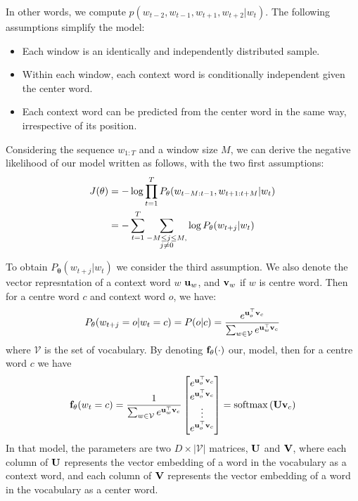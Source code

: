 In other words, we compute $p(w_{t-2}, w_{t-1}, w_{t+1}, w_{t+2} | w_t)$. The following assumptions simplify the model:
\begin{itemize}
    \item Each window is an identically and independently distributed sample.
    \item Within each window, each context word is conditionally independent given the center word.
    \item Each context word can be predicted from the center word in the same way, irrespective of its position.
\end{itemize}
Considering the sequence $w_{1:T}$ and a window size $M$, we can derive the negative likelihood of our model written as follows, with the two first assumptions:
\begin{align}
J(\mathbf{\theta}) &= -\log\prod_{t=1}^{T}P_{\mathbf{\theta}}(w_{t-M:t-1},w_{t+1:t+M}|w_t)\\
&=-\sum_{t=1}^{T}\sum_{\substack{-M\leq j \leq M,\\ j\neq 0}}\log P_{\mathbf{\theta}}(w_{t+j}|w_t)
\end{align}

To obtain $P_{\mathbf{\theta}}(w_{t+j}|w_t)$ we consider the third assumption. We also denote the vector represntation of a context word $w$ $\mathbf{u}_w$, and $\mathbf{v}_w$ if $w$ is centre word. Then for a centre word $c$ and context word $o$, we have:
\begin{equation}
	P_{\mathbf{\theta}}(w_{t+j}=o|w_t=c) = P(o|c) = \frac{e^{\mathbf{u}_o^\top\mathbf{v}_c}}{\sum_{w\in \mathcal{V}}e^{\mathbf{u}_{w}^\top\mathbf{v}_c}}
\end{equation}
where $\mathcal{V}$ is the set of vocabulary. By denoting $\mathbf{f_\theta}(\cdot)$ our, model, then for a centre word $c$ we have
\begin{equation}
	\mathbf{f_\theta}(w_t=c)=\frac{1}{\sum_{w\in \mathcal{V}}e^{\mathbf{u}_{w}^\top\mathbf{v}_c}}\begin{bmatrix}
		e^{\mathbf{u}_o^\top\mathbf{v}_c}\\
		e^{\mathbf{u}_o^\top\mathbf{v}_c}\\
		\vdots\\
		e^{\mathbf{u}_o^\top\mathbf{v}_c}\\
	\end{bmatrix}
	= \mathrm{softmax}\left(\mathbf{Uv}_c\right)
\end{equation}
In that model, the parameters are two $D \times |\mathcal{V}|$ matrices, $\mathbf{U}$ and $\mathbf{V}$, where each column of $\mathbf{U}$ represents the vector embedding of a word in the vocabulary as a context word, and each column of $\mathbf{V}$ represents the vector embedding of a word in the vocabulary as a center word.

